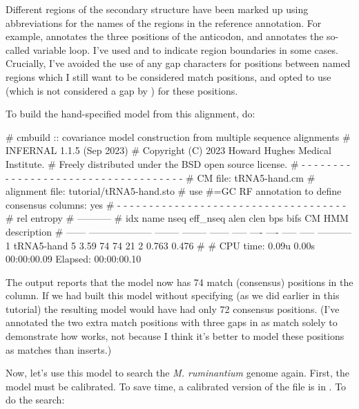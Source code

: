 Different regions of the secondary structure have been marked up using
abbreviations for the names of the regions in the reference
annotation. For example,  annotates the three positions of
the anticodon, and \otext{[vlp]} annotates the so-called variable
loop. I've used \otext{[} and \otext{]} to indicate region boundaries
in some cases. Crucially, I've avoided the use of any gap characters
for positions between named regions which I still want to be
considered match positions, and opted to use \otext{=} (which is not
considered a gap by ) for these positions.

To build the hand-specified model from this alignment, do:


\begin{sreoutput}
# cmbuild :: covariance model construction from multiple sequence alignments
# INFERNAL 1.1.5 (Sep 2023)
# Copyright (C) 2023 Howard Hughes Medical Institute.
# Freely distributed under the BSD open source license.
# - - - - - - - - - - - - - - - - - - - - - - - - - - - - - - - - - - - -
# CM file:                                            tRNA5-hand.cm
# alignment file:                                     tutorial/tRNA5-hand.sto
# use #=GC RF annotation to define consensus columns: yes
# - - - - - - - - - - - - - - - - - - - - - - - - - - - - - - - - - - - -
#                                                                      rel entropy
#                                                                      -----------
# idx    name                     nseq eff_nseq   alen  clen  bps bifs    CM   HMM description
# ------ -------------------- -------- -------- ------ ----- ---- ---- ----- ----- -----------
       1 tRNA5-hand                  5     3.59     74    74   21    2 0.763 0.476 
#
# CPU time: 0.09u 0.00s 00:00:00.09 Elapsed: 00:00:00.10
\end{sreoutput}

The output reports that the model now has 74 match (consensus)
positions in the  column. If we had built this model
without specifying  (as we did earlier in this tutorial)
the resulting model would have had only 72 consensus positions.
(I've annotated the two extra match positions with three gaps in
 as match solely to demonstrate how
 works, not because I think it's better to model these
positions as matches than inserts.)

Now, let's use this model to search the \emph{M. ruminantium} genome
again. First, the model must be calibrated. To save time, a calibrated
version of the file is in . To do the
search:


